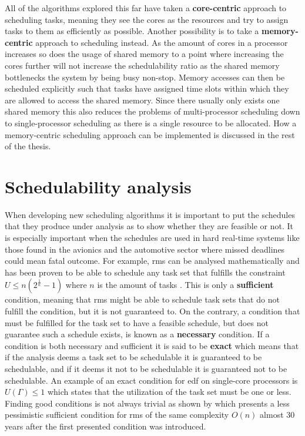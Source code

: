 \documentclass{kththesis}
\begin{document}
All of the algorithms explored this far have taken a \textbf{core-centric} approach to scheduling tasks,
meaning they see the cores as the resources and try to assign tasks to them as efficiently as
possible. Another possibility is to take a \textbf{memory-centric} approach to scheduling instead.
As the amount of cores in a processor increases so does the usage of shared memory to a point where
increasing the cores further will not increase the schedulability ratio as the shared memory
bottlenecks the system by being busy non-stop. Memory accesses can then be scheduled explicitly such
that tasks have assigned time slots within which they are allowed to access the shared memory. Since
there usually only exists one shared memory this also reduces the problems of multi-processor scheduling
down to single-processor scheduling as there is a single resource to be allocated. How a
memory-centric scheduling approach can be implemented is discussed in the rest of the thesis.

\section{Schedulability analysis} \label{sec:schedulability_analysis}

When developing new scheduling algorithms it is important to put the schedules that they produce under
analysis as to show whether they are feasible or not. It is especially important when the schedules
are used in hard real-time systems like those found in the avionics and the automotive sector where
missed deadlines could mean fatal outcome. For example, \acrshort{rms} can be analysed
mathematically and has been proven to be able to schedule any task set that fulfills the constraint
$ U \le n(2^{\frac{1}{n}}-1) $ where $ n $ is the amount of tasks \parencite{liu_scheduling_1973}.
This is only a \textbf{sufficient} condition, meaning that \acrshort{rms} might be able to schedule
task sets that do not fulfill the condition, but it is not guaranteed to. On the contrary, a
condition that must be fulfilled for the task set to have a feasible schedule, but does not
guarantee such a schedule exists, is known as a \textbf{necessary} condition. If a condition is both
necessary and sufficient it is said to be \textbf{exact} which means that if the analysis deems a
task set to be schedulable it is guaranteed to be schedulable, and if it deems it not to be
schedulable it is guaranteed not to be schedulable. An example of an exact condition for
\acrshort{edf} on single-core processors is $ U(\Gamma) \leq 1 $ which states that the utilization
of the task set must be one or less. Finding good conditions is not always trivial as shown by
\parencite{bini_hyperbolic_2001} which presents a less pessimistic sufficient condition for
\acrshort{rms} of the same complexity $ O(n) $ almost 30 years after the first presented condition
was introduced. 
\end{document}
